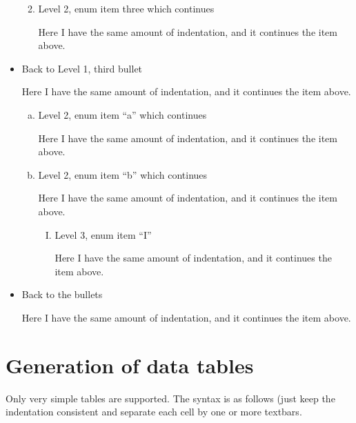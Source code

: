 \documentclass[DIV=12,%
               BCOR=0mm,%
               fontsize=10pt,%
               oneside,%
               paper=210mm:11in]{scrbook}
\begin{document}
\begin{itemize}
\begin{enumerate}[1.]
\begin{enumerate}[i.]
\end{enumerate}


\item\relax 
Level 2, enum item three
which continues


Here I have the same amount of indentation, and it continues the
item above.




\end{enumerate}


\item\relax 
Back to Level 1, third bullet


Here I have the same amount of indentation, and it continues the
item above.


\begin{enumerate}[a.]
\item\relax 
Level 2, enum item “a”
which continues


Here I have the same amount of indentation, and it continues the
item above.



\item\relax 
Level 2, enum item “b”
which continues


Here I have the same amount of indentation, and it continues the
item above.


\begin{enumerate}[I.]
\item\relax 
Level 3, enum item “I”


Here I have the same amount of indentation, and it continues the
item above.




\end{enumerate}



\end{enumerate}


\item\relax 
Back to the bullets


Here I have the same amount of indentation, and it continues the
item above.




\end{itemize}
\chapter{Generation of data tables}


Only very simple tables are supported.  The syntax is as follows (just keep the indentation consistent and separate each cell by one or more textbars.
\end{document}

